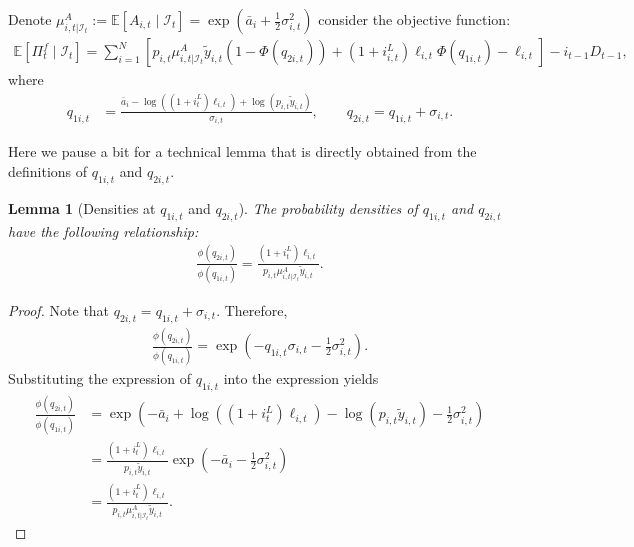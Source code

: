 \documentclass[12pt]{article}
\newtheorem{lemma}{Lemma}[section]
\numberwithin{equation}{section}
\begin{document}
\begin{appendix}
Denote $\mu^A_{i, t|\mathcal{I}_t} := \mathbb{E}\left[A_{i,t} \mid \mathcal{I}_t\right] = \exp \left(\bar{a}_i + \frac{1}{2}\sigma_{i,t}^2 \right)$ consider the objective function:
\begin{align}\label{eq:exp_fina_intermediary_profit}
    \mathbb{E} \left[\Pi^f_t \mid \mathcal{I}_t \right] = \sum_{i=1}^N \left[p_{i,t}\mu^A_{i, t|\mathcal{I}_t} \tilde{y}_{i,t}\left(1-\Phi(q_{2i,t})\right) + (1+i^L_{i,t})\ell_{i,t} \Phi(q_{1i,t}) - \ell_{i,t}\right] - i_{t-1}D_{t-1},
\end{align}
where
\begin{align*}
    q_{1i,t} &= \frac{\bar{a}_i - \log\left((1+i^L_{t})\ell_{i,t}\right) + \log \left(p_{i,t}\tilde{y}_{i,t}\right)}{\sigma_{i,t}}, \qquad q_{2i,t} = q_{1i,t} + \sigma_{i,t}.
\end{align*}

Here we pause a bit for a technical lemma that is directly obtained from the definitions of $q_{1i,t}$ and $q_{2i,t}$.
\begin{lemma}[Densities at $q_{1i,t}$ and $q_{2i,t}$]\label{lemma:pdf_q1_q2}
    The probability densities of $q_{1i,t}$ and $q_{2i,t}$ have the following relationship:
    \begin{align*}
        \frac{\phi(q_{2i,t})}{\phi(q_{1i,t})} = \frac{\left(1+i^L_{t}\right)\ell_{i,t}}{p_{i,t}\mu^A_{i, t|\mathcal{I}_t}\tilde{y}_{i,t}}.
    \end{align*}
\end{lemma}
\begin{proof}
    Note that $q_{2i,t} = q_{1i,t} + \sigma_{i,t}$. Therefore,
    \begin{align*}
        \frac{\phi(q_{2i,t})}{\phi(q_{1i,t})} = \exp \left(-q_{1i,t}\sigma_{i,t} -\frac{1}{2} \sigma_{i,t}^2 \right).
    \end{align*}
    Substituting the expression of $q_{1i,t}$ into the expression yields
    \begin{align*}
        \frac{\phi(q_{2i,t})}{\phi(q_{1i,t})} &= \exp \left(-\bar{a}_i + \log\left((1+i^L_{t})\ell_{i,t}\right) - \log \left(p_{i,t}\tilde{y}_{i,t}\right) - \frac{1}{2}\sigma_{i,t}^2 \right)\\
        &= \frac{\left(1+i^L_{t}\right)\ell_{i,t}}{p_{i,t}\tilde{y}_{i,t}} \exp \left(-\bar{a}_i - \frac{1}{2}\sigma_{i,t}^2 \right)\\
        &= \frac{\left(1+i^L_{t}\right)\ell_{i,t}}{p_{i,t}\mu^A_{i, t|\mathcal{I}_t}\tilde{y}_{i,t}}.
    \end{align*}
\end{proof}


\end{appendix}
\end{document}
